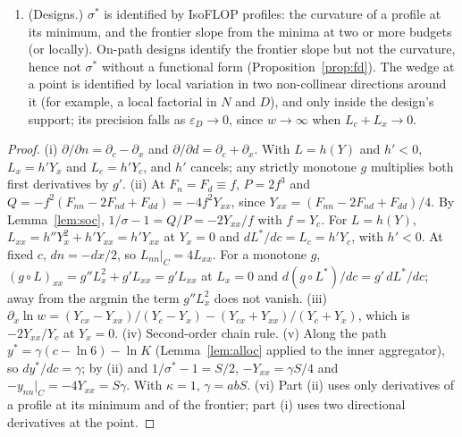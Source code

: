 \begin{proposition}
\begin{enumerate}
imposes $S=\gamma/(ab)$, that is, $-y_{nn}|_C=\gamma^2/(ab)$: the curvature of every IsoFLOP profile in log reducible loss is
pinned by the slopes of the frontier and of the path. With $\kappa$ free the curvature is a separate parameter, which
\eqref{eq:A-mf} measures without the restriction.
\item[(vi)] (Designs.) $\sigma^*$ is identified by IsoFLOP profiles: the curvature of a profile at its minimum, and the
frontier slope from the minima at two or more budgets (or locally). On-path designs identify the frontier slope but not
the curvature, hence not $\sigma^*$ without a functional form (Proposition~\ref{prop:fd}). The wedge at a point is identified by local variation in two non-collinear directions around
it (for example, a local factorial in $N$ and $D$), and only inside the design's support; its precision falls as
$\varepsilon_D\to0$, since $w\to\infty$ when $L_c+L_x\to0$.
\end{enumerate}
\end{proposition}

\begin{proof}
(i) $\partial/\partial n=\partial_c-\partial_x$ and $\partial/\partial d=\partial_c+\partial_x$. With $L=h(Y)$ and $h'<0$,
$L_x=h'Y_x$ and $L_c=h'Y_c$, and $h'$ cancels; any strictly monotone $g$ multiplies both first derivatives by $g'$.
(ii) At $F_n=F_d\equiv f$, $P=2f^3$ and $Q=-f^2(F_{nn}-2F_{nd}+F_{dd})=-4f^2Y_{xx}$, since
$Y_{xx}=(F_{nn}-2F_{nd}+F_{dd})/4$. By Lemma~\ref{lem:soc}, $1/\sigma-1=Q/P=-2Y_{xx}/f$ with $f=Y_c$. For $L=h(Y)$,
$L_{xx}=h''Y_x^2+h'Y_{xx}=h'Y_{xx}$ at $Y_x=0$ and $dL^*/dc=L_c=h'Y_c$, with $h'<0$. At fixed $c$, $dn=-dx/2$, so
$L_{nn}|_C=4L_{xx}$. For a monotone $g$, $(g\circ L)_{xx}=g''L_x^2+g'L_{xx}=g'L_{xx}$ at $L_x=0$ and
$d(g\circ L^*)/dc=g'\,dL^*/dc$; away from the argmin the term $g''L_x^2$ does not vanish.
(iii) $\partial_x\ln w=(Y_{cx}-Y_{xx})/(Y_c-Y_x)-(Y_{cx}+Y_{xx})/(Y_c+Y_x)$, which is $-2Y_{xx}/Y_c$ at $Y_x=0$.
(iv) Second-order chain rule. (v) Along the path $y^*=\gamma(c-\ln6)-\ln K$ (Lemma~\ref{lem:alloc} applied to the inner
aggregator), so $dy^*/dc=\gamma$; by (ii) and $1/\sigma^*-1=S/2$, $-Y_{xx}=\gamma S/4$ and $-y_{nn}|_C=-4Y_{xx}=S\gamma$. With
$\kappa=1$, $\gamma=abS$. (vi) Part (ii) uses only derivatives of a profile at its minimum and of the frontier; part (i)
uses two directional derivatives at the point.
\end{proof}

